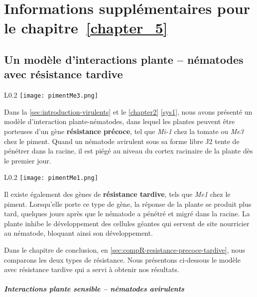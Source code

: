 	
	
\renewcommand{\tablename}{Tableau}
\renewcommand{\figurename}{Figure}
\chapter{Informations supplémentaires pour le chapitre~\ref{chapter_5}}
\label{annexeChap5}
	

  
\section{Un modèle d'interactions plante -- nématodes avec résistance tardive}
\label{diff_mod}


\begin{wrapfigure}[6]{L}{0.2\textwidth}
  \vspace{-\baselineskip}
  \texttt{[image: pimentMe3.png]}
\end{wrapfigure}
\noindent
Dans la \autoref{sec:introduction-virulents} et le \autoref{chapter2} \eqref{sys1}, nous avons présenté un modèle d'interaction plante-nématodes, dans lequel les plantes peuvent être porteuses d'un gène \textbf{résistance précoce}, tel que \textit{Mi-1} chez la tomate ou \textit{Me3} chez le piment. Quand un nématode avirulent sous sa forme libre J2  tente de pénétrer dans la racine,  il est piégé au niveau du cortex racinaire de la plante dès le premier jour.
\bigskip

\begin{wrapfigure}[6]{L}{0.2\textwidth}
  \vspace{-\baselineskip}
  \texttt{[image: pimentMe1.png]}
\end{wrapfigure}
\noindent
Il existe également des gènes de \textbf{résistance tardive}, tels que \emph{Me1} chez le piment. Lorsqu'elle porte ce type de gène, la réponse de la  plante se produit plus tard, quelques jours après que le nématode a pénétré et migré dans la racine. La plante inhibe le développement des cellules géantes qui servent de site nourricier au nématode, bloquant ainsi son développement.

Dans le chapitre de conclusion, en \autoref{sec:compR-resistance-precoce-tardive}, nous comparons les deux types de résistance. Nous présentons ci-dessous le modèle avec résistance tardive qui a servi à obtenir nos résultats.

\paragraph{Interactions plante sensible --  nématodes avirulents}

